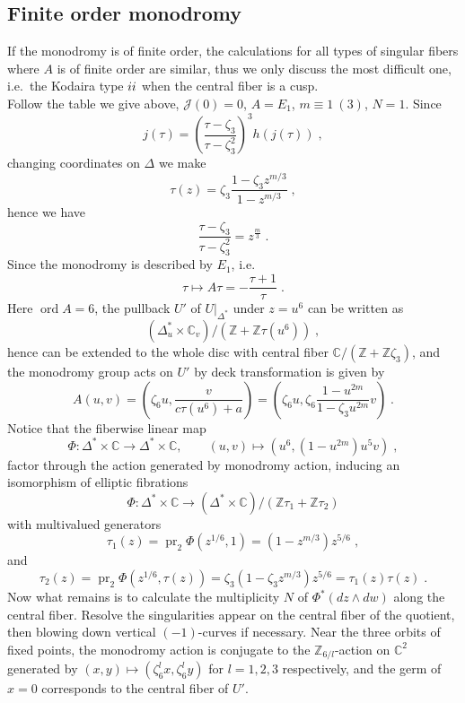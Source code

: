 \subsection{Finite order monodromy}
If the monodromy is of finite order, the calculations for all types of singular fibers where $A$ is of finite order are similar, thus we only discuss the most difficult one, i.e.\ the Kodaira type $\uppercase\expandafter{\romannumeral2}$ when the central fiber is a cusp.\\ \indent
Follow the table we give above, $\mathscr{J}(0)=0$, $A=E_1$, $m\equiv1~(3)$, $N=1$. Since
\[ j(\tau)=\left(\frac{\tau-\zeta_3}{\tau-\zeta_3^2}\right)^3h(j(\tau))\; , \]
changing coordinates on $\Delta$ we make 
\[ \tau(z)=\zeta_3\frac{1-\zeta_3z^{m/3}}{1-z^{m/3}}\; , \]
hence we have
\[ \frac{\tau-\zeta_3}{\tau-\zeta_3^2}=z^{\frac{m}{3}}\; . \]
\indent Since the monodromy is  described by $E_1$, i.e.
\[ \tau\mapsto A\tau=-\frac{\tau+1}{\tau}\; . \]
\indent Here $\operatorname{ord}A=6$, the pullback $U'$ of $U|_{\Delta^*}$ under $z=u^6$ can be written as
\[ (\Delta_u^*\times\mathbb{C}_v)/(\mathbb{Z}+\mathbb{Z}\tau(u^6))\; , \]
hence can be extended to the whole disc with central fiber $\mathbb{C}/(\mathbb{Z}+\mathbb{Z}\zeta_3)$, and the monodromy group acts on $U'$ by deck transformation is given by
\[ A(u,v)=\left(\zeta_6u,\frac{v}{c\tau(u^6)+a}\right)=\left(\zeta_6u,\zeta_6\frac{1-u^{2m}}{1-\zeta_3u^{2m}}v\right)\; . \]
\indent Notice that the fiberwise linear map
\[ \Phi\colon\Delta^*\times \mathbb{C}\rightarrow \Delta^*\times\mathbb{C},\qquad (u,v)\mapsto (u^6,(1-u^{2m})u^5v)\; , \]
factor through the action generated by monodromy action, inducing an isomorphism of elliptic fibrations
\[ \Phi\colon\Delta^*\times \mathbb{C}\rightarrow (\Delta^*\times\mathbb{C})/(\mathbb{Z}\tau_1+\mathbb{Z}\tau_2) \]
with multivalued generators
\[ \tau_1(z)=\operatorname{pr}_2\Phi(z^{1/6},1)=(1-z^{m/3})z^{5/6}\; , \]
and
\[ \tau_2(z)=\operatorname{pr}_2 \Phi(z^{1/6},\tau(z))=\zeta_3(1-\zeta_3z^{m/3})z^{5/6}=\tau_1(z)\tau(z)\; . \]
\indent Now what remains is to calculate the multiplicity $N$ of $\Phi^*(dz\wedge dw)$ along the central fiber. Resolve the singularities appear on the central fiber of the quotient, then blowing down vertical $(-1)$-curves if necessary. Near the three orbits of fixed points, the monodromy action is conjugate to the $\mathbb{Z}_{6/l}$-action on $\mathbb{C}^2$ generated by $(x,y)\mapsto(\zeta_6^lx,\zeta_6^ly)$ for $l=1,2,3$ respectively, and the germ of $x=0$ corresponds to the central fiber of $U'$.\\ \indent
